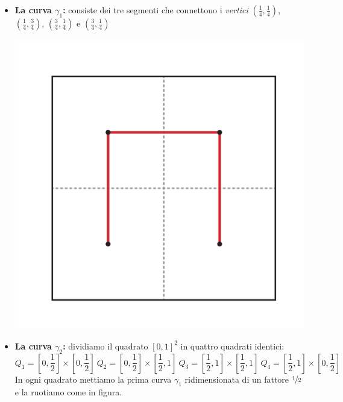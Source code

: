 \begin{itemize}
	\item \textbf{La curva $\gamma_1$:} consiste dei tre segmenti che connettono i \textit{vertici} $\left(\frac{1}{4},\frac{1}{4}\right)$, $\left(\frac{1}{4},\frac{3}{4}\right)$, $\left(\frac{3}{4},\frac{1}{4}\right)$ e $\left(\frac{3}{4},\frac{1}{4}\right)$
	\begin{center}
		\includegraphics[trim=1.8cm 1.8cm 1.8cm 1.8cm, clip, scale=0.25]{images/hilbert1.pdf}
	\end{center}
	\item \textbf{La curva $\gamma_2$:} dividiamo il quadrato $\left[0,1\right]^2$ in quattro quadrati identici:
	\begin{equation*}
		Q_1=\left[0,\frac{1}{2}\right]\times\left[0,\frac{1}{2}\right]\  Q_2=\left[0,\frac{1}{2}\right]\times\left[\frac{1}{2},1\right]\ 
		Q_3=\left[\frac{1}{2},1\right]\times\left[\frac{1}{2},1\right]\ 
		Q_4=\left[\frac{1}{2},1\right]\times\left[0,\frac{1}{2}\right]
	\end{equation*}
	In ogni quadrato mettiamo la prima curva $\gamma_1$ ridimensionata di un fattore $\nicefrac{1}{2}$ e la ruotiamo come in figura.
	\begin{center}

\end{center}
\end{itemize}
